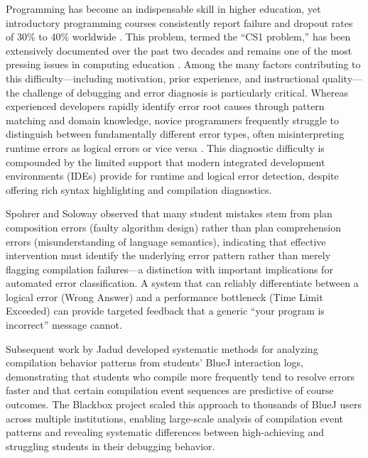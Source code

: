 \documentclass[10pt,letterpaper]{article}
\begin{document}
Programming has become an indispensable skill in higher education, yet
introductory programming courses consistently report failure and dropout rates
of 30\% to 40\% worldwide \cite{bennedsen2007failure}\cite{watson2018failure}. This
problem, termed the ``CS1 problem,'' has been extensively
documented over the past two decades and remains one of the most pressing
issues in computing education \cite{pears2007survey}. Among the many factors
contributing to this difficulty---including motivation, prior experience,
and instructional quality---the challenge of debugging and error diagnosis is
particularly critical. Whereas experienced developers rapidly identify
error root causes through pattern matching and domain knowledge, novice
programmers frequently struggle to distinguish between fundamentally different
error types, often misinterpreting runtime errors as logical errors or vice
versa \cite{mccauley2008evidence}. This diagnostic difficulty is compounded by
the limited support that modern integrated development environments (IDEs)
provide for runtime and logical error detection, despite offering rich
syntax highlighting and compilation diagnostics.

Spohrer and Soloway \cite{spohrer1986novice} observed that many student
mistakes stem from plan composition errors (faulty algorithm design) rather
than plan comprehension errors (misunderstanding of language semantics),
indicating that effective intervention must identify the underlying
error pattern rather than merely flagging compilation failures---a distinction
with important implications for automated error classification.
A system that can reliably differentiate between a logical error (Wrong
Answer) and a performance bottleneck (Time Limit Exceeded) can provide
targeted feedback that a generic ``your program is incorrect'' message cannot.

Subsequent work by Jadud \cite{jadud2006methods} developed systematic methods
for analyzing compilation behavior patterns from students' BlueJ interaction
logs, demonstrating that students who compile more frequently tend to resolve
errors faster and that certain compilation event sequences are predictive of
course outcomes. The Blackbox project \cite{bey2022analyzing} scaled this
approach to thousands of BlueJ users across multiple institutions, enabling
large-scale analysis of compilation event patterns and revealing systematic
differences between high-achieving and struggling students in their debugging
behavior.
\end{document}
